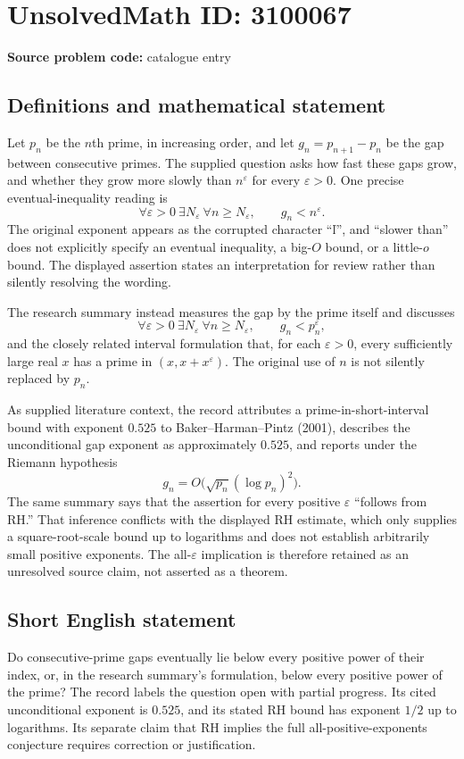 \documentclass[11pt]{article}
\begin{document}
\section*{UnsolvedMath ID: 3100067}
\textbf{Source problem code:} catalogue entry
\subsection{Definitions and mathematical statement}
Let $p_n$ be the $n$th prime, in increasing order, and let $g_n=p_{n+1}-p_n$ be the gap between consecutive primes. The supplied question asks how fast these gaps grow, and whether they grow more slowly than $n^{\varepsilon}$ for every $\varepsilon>0$. One precise eventual-inequality reading is
\[
 \forall\varepsilon>0\ \exists N_{\varepsilon}\ \forall n\ge N_{\varepsilon},
 \qquad g_n<n^{\varepsilon}.
\]
The original exponent appears as the corrupted character ``ľ'', and ``slower than'' does not explicitly specify an eventual inequality, a big-$O$ bound, or a little-$o$ bound. The displayed assertion states an interpretation for review rather than silently resolving the wording.

The research summary instead measures the gap by the prime itself and discusses
\[
 \forall\varepsilon>0\ \exists N_{\varepsilon}\ \forall n\ge N_{\varepsilon},
 \qquad g_n<p_n^{\varepsilon},
\]
and the closely related interval formulation that, for each $\varepsilon>0$, every sufficiently large real $x$ has a prime in $(x,x+x^{\varepsilon})$. The original use of $n$ is not silently replaced by $p_n$.

As supplied literature context, the record attributes a prime-in-short-interval bound with exponent $0.525$ to Baker--Harman--Pintz (2001), describes the unconditional gap exponent as approximately $0.525$, and reports under the Riemann hypothesis
\[
 g_n=O\bigl(\sqrt{p_n}(\log p_n)^2\bigr).
\]
The same summary says that the assertion for every positive $\varepsilon$ ``follows from RH.'' That inference conflicts with the displayed RH estimate, which only supplies a square-root-scale bound up to logarithms and does not establish arbitrarily small positive exponents. The all-$\varepsilon$ implication is therefore retained as an unresolved source claim, not asserted as a theorem.
\subsection{Short English statement}
Do consecutive-prime gaps eventually lie below every positive power of their index, or, in the research summary's formulation, below every positive power of the prime? The record labels the question open with partial progress. Its cited unconditional exponent is $0.525$, and its stated RH bound has exponent $1/2$ up to logarithms. Its separate claim that RH implies the full all-positive-exponents conjecture requires correction or justification.
\end{document}
